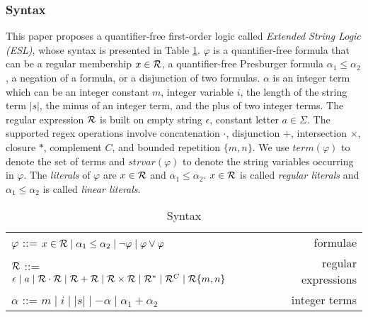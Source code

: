 \subsubsection{Syntax}
This paper proposes a quantifier-free first-order logic called \textit{Extended String Logic (ESL)}, whose syntax is presented in Table \ref{tab:syntax}. $\varphi$ is a quantifier-free formula that can be a regular membership $x\in\mathcal{R}$, a quantifier-free Presburger formula $\alpha_1 \leq \alpha_2$, a negation of a formula, or a disjunction of two formulas. $\alpha$ is an integer term which can be an integer constant $m$, integer variable $i$, the length of the string term $|s|$, the minus of an integer term, and the plus of two integer terms. The regular expression $\mathcal{R}$ is built on empty string $\epsilon$, constant letter $a\in \Sigma$. The supported regex operations involve concatenation $\cdot$, disjunction $+$, intersection $\times$, closure $*$, complement $C$, and bounded repetition $\{m, n\}$. We use $term(\varphi)$ to denote the set of terms and $strvar(\varphi)$ to denote the string variables occurring in $\varphi$. The \emph{literals} of $\varphi$ are $x\in \mathcal{R}$ and $\alpha_1 \leq \alpha_2$. $x\in \mathcal{R}$ is called \emph{regular literals} and $\alpha_1 \leq \alpha_2$ is called \emph{linear literals}.
\begin{table}[h]
  \centering
  \begin{tabular}{l r}
    $\varphi$ ::= $x\in \mathcal{R} \mid \alpha_1\leq\alpha_2 \mid \neg\varphi\mid \varphi\vee\varphi$                                             & formulae            \\
    $\mathcal{R}$ ::= $\epsilon\mid a\mid \mathcal{R}\cdot\mathcal{R}\mid \mathcal{R}+\mathcal{R}\mid \mathcal{R}\times \mathcal{R}\mid \mathcal{R}^*\mid\mathcal{R}^C \mid \mathcal{R}\{m,n\}$ & regular expressions \\
    $\alpha$ ::= $m \mid i \mid  |s|\mid -\alpha\mid \alpha_1+\alpha_2$                                                                       & integer terms
  \end{tabular}
  \caption{Syntax}\label{tab:syntax}
\end{table}
